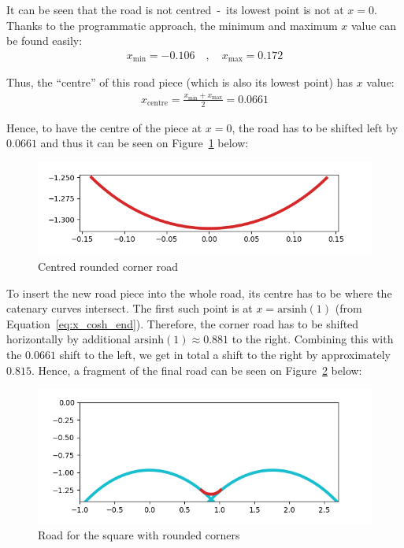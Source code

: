 \documentclass[12pt]{article}
\begin{document}
        It can be seen that the road is not centred~-~its lowest point is not at $x=0$. Thanks to the programmatic approach, the minimum and maximum $x$ value can be found easily:
        \begin{align*}
            x_{\text{min}} = -0.106 \quad , \quad x_{\text{max}} = 0.172
        \end{align*}

        Thus, the ``centre'' of this road piece (which is also its lowest point) has $x$ value:
        \begin{align}
            x_{\text{centre}} = \frac{x_{\text{min}}+x_{\text{max}}}{2} = 0.0661
        \end{align}

        Hence, to have the centre of the piece at $x=0$, the road has to be shifted left by $0.0661$ and thus it can be seen on Figure~\ref{fig:corner_road_centered} below:
        \begin{figure}[H]
            \includegraphics[width=\linewidth]{images/centered_corner_road.png}
            \caption{Centred rounded corner road}\label{fig:corner_road_centered}
        \end{figure}

        To insert the new road piece into the whole road, its centre has to be where the catenary curves intersect. The first such point is at $x=\text{arsinh}(1)$ (from Equation~\ref{eq:x_cosh_end}). Therefore, the corner road has to be shifted horizontally by additional $\text{arsinh}(1) \approx 0.881$ to the right. Combining this with the $0.0661$ shift to the left, we get in total a shift to the right by approximately $0.815$. Hence, a fragment of the final road can be seen on Figure~\ref{fig:corner_road_full} below:
        \begin{figure}[H]
            \includegraphics[width=\linewidth]{images/road_with_corner.png}
            \caption{Road for the square with rounded corners}\label{fig:corner_road_full}
        \end{figure}
\end{document}
